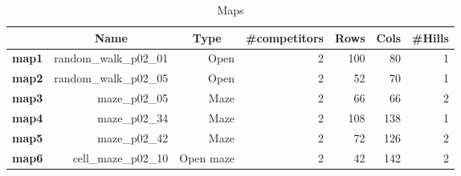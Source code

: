 \begin{table}[htbp]
  \centering
  \caption{Maps}
    \begin{tabular}{rrrrrrr}
    \hline
          & \multicolumn{1}{c}{\textbf{Name}} & \multicolumn{1}{c}{\textbf{Type}} & \multicolumn{1}{c}{\textbf{\#competitors}} & \multicolumn{1}{c}{\textbf{Rows}} & \multicolumn{1}{c}{\textbf{Cols}} & \multicolumn{1}{c}{\textbf{\#Hills}} \\
    \hline
    \textbf{map1} & random\_walk\_p02\_01 & Open  & 2     & 100   & 80    & 1 \\
    \textbf{map2} & random\_walk\_p02\_05 & Open  & 2     & 52    & 70    & 1 \\
    \textbf{map3} & maze\_p02\_05 & Maze  & 2     & 66    & 66    & 2 \\
    \textbf{map4} & maze\_p02\_34 & Maze  & 2     & 108   & 138   & 1 \\
    \textbf{map5} & maze\_p02\_42 & Maze  & 2     & 72    & 126   & 2 \\
    \textbf{map6} & cell\_maze\_p02\_10 & Open maze  & 2     & 42    & 142   & 2 \\
    \hline
    \end{tabular}%
  \label{tab:maps}%
\end{table}%
